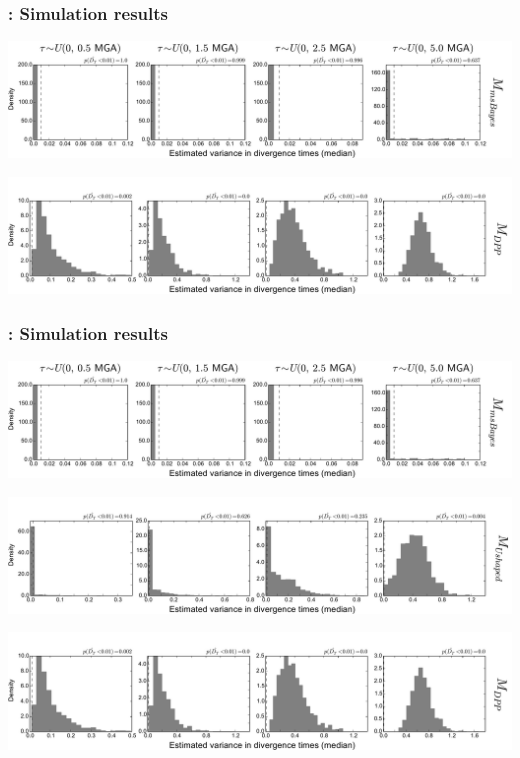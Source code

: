\begin{frame}[t]
    \frametitle{\dppmsbayes: Simulation results}
    \vspace{1cm}
        \centerline{
        \includegraphics[width=1.13\textwidth]{../images/old_old_power_omega_median.pdf}}
        \vspace{0mm}
        \centerline{
        \includegraphics[width=1.13\textwidth]{../images/old_dpp_power_omega_median_headless.pdf}}
\end{frame}

\begin{frame}
    \frametitle{\dppmsbayes: Simulation results}
        \centerline{
        \includegraphics[width=\textwidth]{../images/old_old_power_omega_median.pdf}}
        \vspace{0mm}
        \centerline{
        \includegraphics[width=\textwidth]{../images/old_u-shaped_power_omega_median_headless.pdf}}
        \vspace{0mm}
        \centerline{
        \includegraphics[width=\textwidth]{../images/old_dpp_power_omega_median_headless.pdf}}
\end{frame}

